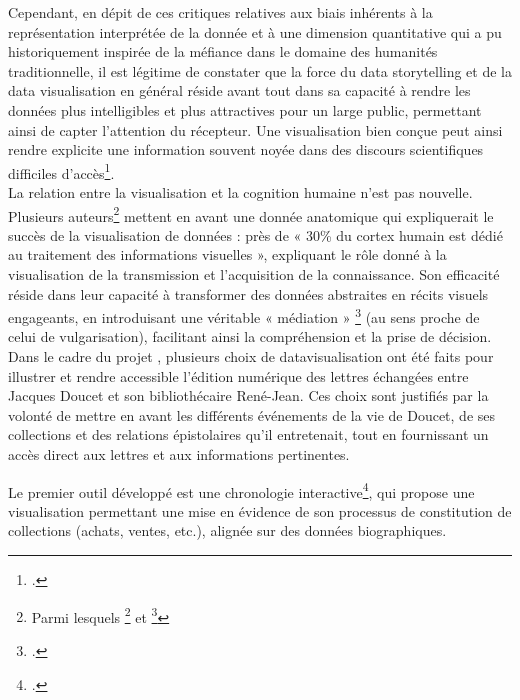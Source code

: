 Cependant, en dépit de ces critiques relatives aux biais inhérents à la représentation interprétée de la donnée et à une dimension quantitative qui a pu historiquement inspirée de la méfiance dans le domaine des humanités traditionnelle, il est légitime de constater que la force du data storytelling et de la data visualisation en général réside avant tout dans sa capacité à rendre les données plus intelligibles et plus attractives pour un large public, permettant ainsi de capter l’attention du récepteur. Une visualisation bien conçue peut ainsi rendre explicite une information souvent noyée dans des discours scientifiques difficiles d’accès\footcite{shao_data_2024}.
\newline
{}\\

La relation entre la visualisation et la cognition humaine n’est pas nouvelle. Plusieurs auteurs\footnote{Parmi lesquels \footcite[p.451]{graham_introduction_2017} et \footcite[p.536]{pawlicka_data_2017}} mettent en avant une donnée anatomique qui expliquerait le succès de la visualisation de données : près de « 30\% du cortex humain est dédié au traitement des informations visuelles », expliquant le rôle donné à la visualisation de la transmission et l’acquisition de la connaissance.    Son efficacité réside dans leur capacité à transformer des données abstraites en récits visuels engageants, en introduisant une véritable « médiation » \footcite[p.80-99]{hinrichs_defense_2019} (au sens proche de celui de vulgarisation), facilitant ainsi la compréhension et la prise de décision.
\newline
{}\\

Dans le cadre du projet \pense, plusieurs choix de datavisualisation ont été faits pour illustrer et rendre accessible l’édition numérique des lettres échangées entre Jacques Doucet et son bibliothécaire René-Jean. Ces choix sont justifiés par la volonté de mettre en avant les différents événements de la vie de Doucet, de ses collections et des relations épistolaires qu’il entretenait, tout en fournissant un accès direct aux lettres et aux informations pertinentes.

Le premier outil développé est une chronologie interactive\footcite{noauthor_chronologie_nodate}, qui propose une visualisation permettant une mise en évidence de son processus de constitution de collections (achats, ventes, etc.), alignée sur des données biographiques.

